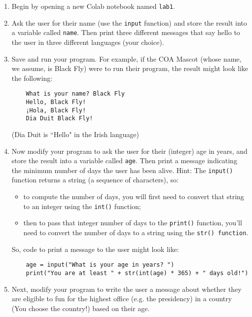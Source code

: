 \documentclass[10pt]{article}
\begin{document}
  \begin{enumerate}
    \item Begin by opening a new Colab notebook named {\tt lab1}.
    \item Ask the user for their name (use the {\tt input} function) and store
    the result into a variable called {\tt name}.
    Then print three different messages that say hello to the user in three
    different languages (your choice).
    \item Save and run your program.  For example, if the COA Mascot (whose
    name, we assume, is Black Fly) were to run their program, the result might
    look like the following:
\begin{verbatim}
    What is your name? Black Fly
    Hello, Black Fly!
    ¡Hola, Black Fly!
    Dia Duit Black Fly!
\end{verbatim}
(Dia Duit is ``Hello" in the Irish language)
    \item Now modify your program to ask the user for their (integer) age in
    years, and store the result into a variable called {\tt age}. 
    Then print a message indicating the minimum number of days the user has
    been alive.
    \vspace*{10pt} Hint: The {\tt input()} function returns a string (a
        sequence of characters), so:
        \begin{itemize}
            \item to compute the number of days, you will first need to convert that string to an integer using the {\tt int()} function;
            \item then to pass that integer number of days to the {\tt print()}
                function, you'll need to convert the number of days to a string
                using the {\tt str() function}.
        \end{itemize}
        So, code to print a message to the user might look like:
\begin{verbatim}
    age = input("What is your age in years? ")
    print("You are at least " + str(int(age) * 365) + " days old!")
\end{verbatim}


    \item Next, modify your program to write the user a message about whether they are eligible to fun for the highest office (e.g. the presidency) in a country (You choose the country!) based on their age. 


\end{enumerate}
\end{document}
